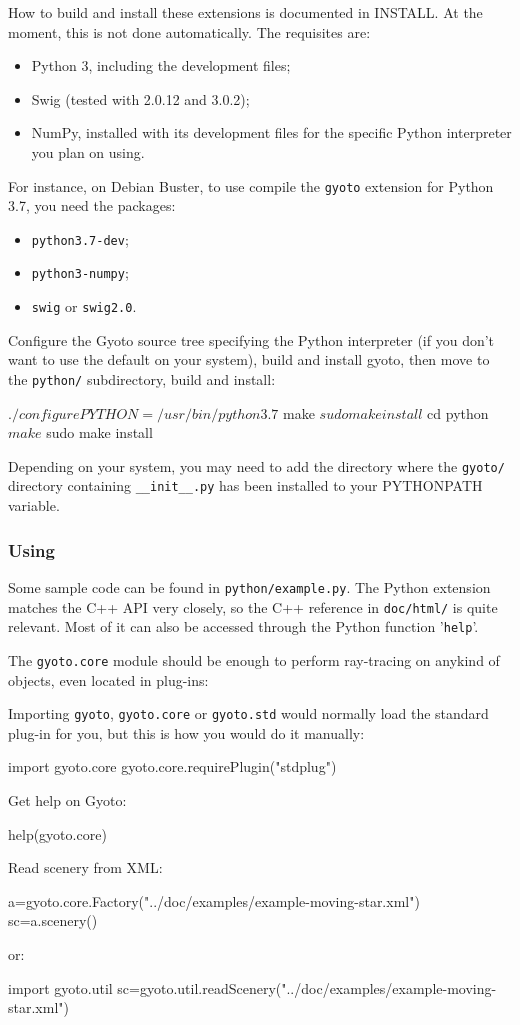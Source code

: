 \documentclass[a4paper,12pt]{article}
\begin{document}
How to build and install these extensions is documented in INSTALL. At
the moment, this is not done automatically. The requisites are:
\begin{itemize}
\item Python 3, including the development files;
\item Swig (tested with 2.0.12 and 3.0.2);
\item NumPy, installed with its development files for the specific
  Python interpreter you plan on using.
\end{itemize}
For instance, on Debian Buster, to use compile the \texttt{gyoto}
extension for Python 3.7, you need the packages:
\begin{itemize}
\item \texttt{python3.7-dev};
\item \texttt{python3-numpy};
\item \texttt{swig} or \texttt{swig2.0}.
\end{itemize}
Configure the Gyoto source tree specifying the Python interpreter (if
you don't want to use the default on your system), build and install
gyoto, then move to the \texttt{python/} subdirectory, build and install:
\begin{code}
 $ ./configure PYTHON=/usr/bin/python3.7
 $ make
 $ sudo make install
 $ cd python
 $ make
 $ sudo make install
\end{code}
Depending on your system, you may need to add the directory where the
\texttt{gyoto/} directory containing \texttt{\_\_init\_\_.py} has been
installed to your PYTHONPATH variable.

\subsubsection{Using}

Some sample code can be found in \texttt{python/example.py}. The
Python extension matches the C++ API very closely, so the C++
reference in \texttt{doc/html/} is quite relevant. Most of it can also
be accessed through the Python function '\texttt{help}'.

The \texttt{gyoto.core} module should be enough to perform ray-tracing
on anykind of objects, even located in plug-ins:

Importing \texttt{gyoto}, \texttt{gyoto.core} or \texttt{gyoto.std}
would normally load the standard plug-in for you, but this is how you
would do it manually:
\begin{code}
  import gyoto.core
  gyoto.core.requirePlugin("stdplug")
\end{code}
Get help on Gyoto:
\begin{code}
  help(gyoto.core)
\end{code}
Read scenery from XML:
\begin{code}
  a=gyoto.core.Factory("../doc/examples/example-moving-star.xml")
  sc=a.scenery()
\end{code}
or:
\begin{code}
  import gyoto.util
  sc=gyoto.util.readScenery("../doc/examples/example-moving-star.xml")
\end{code}
\end{document}

